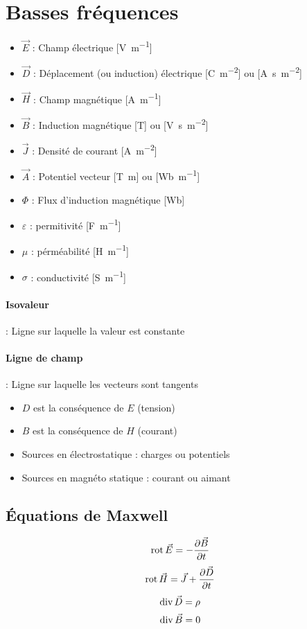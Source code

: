 \documentclass[resume]{subfiles}
\begin{document}
\section{Basses fréquences}
\begin{itemize}
\item $\vec{E}$ : Champ électrique [\si{\volt\per\meter}]
\item $\vec{D}$ : Déplacement (ou induction) électrique [\si{\coulomb\per\square\meter}] ou [\si{\ampere\second\per\square\meter}]
\item $\vec{H}$ : Champ magnétique [\si{\ampere\per\meter}]
\item $\vec{B}$ : Induction magnétique [\si{\tesla}] ou [\si{\volt\second\per\square\meter}]
\item $\vec{J}$ : Densité de courant [\si{\ampere\per\square\meter}]
\item $\vec{A}$ : Potentiel vecteur [\si{\tesla\meter}] ou [\si{\weber\per\meter}]
\item $\Phi$ : Flux d'induction magnétique [\si{\weber}]
\item $\varepsilon$ : permitivité [\si{\farad\per\meter}]
\item $\mu$ : pérméabilité [\si{\henry\per\meter}]
\item $\sigma$ : conductivité [\si{\siemens\per\meter}]
\end{itemize}
\paragraph{Isovaleur} : Ligne sur laquelle la valeur est constante
\paragraph{Ligne de champ} : Ligne sur laquelle les vecteurs sont tangents
\begin{itemize}
\item $D$ est la conséquence de $E$ (tension)
\item $B$ est la conséquence de $H$ (courant)
\end{itemize}
\begin{itemize}
\item Sources en électrostatique : charges ou potentiels
\item Sources en magnéto statique : courant ou aimant
\end{itemize}



\subsection{Équations de Maxwell}
$$\operatorname{rot}\vec{E}=-\frac{\partial \vec{B}}{\partial t}$$
$$\operatorname{rot}\vec{H}=\vec{J}+\frac{\partial \vec{D}}{\partial t}$$
$$\operatorname{div}\vec{D}=\rho$$
$$\operatorname{div}\vec{B}=0$$
\end{document}
